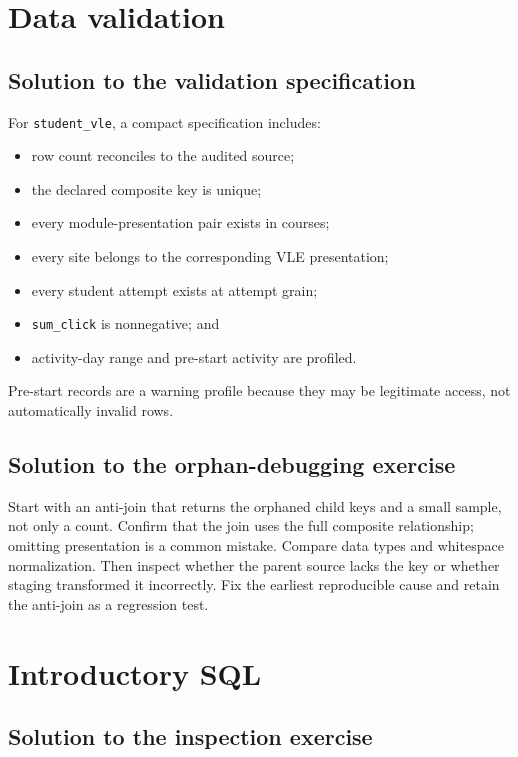 \section{Data validation}

\subsection{Solution to the validation specification}
\label{sol:validation-spec}

For \texttt{student\_vle}, a compact specification includes:
\begin{itemize}
  \item row count reconciles to the audited source;
  \item the declared composite key is unique;
  \item every module-presentation pair exists in courses;
  \item every site belongs to the corresponding VLE presentation;
  \item every student attempt exists at attempt grain;
  \item \texttt{sum\_click} is nonnegative; and
  \item activity-day range and pre-start activity are profiled.
\end{itemize}
Pre-start records are a warning profile because they may be legitimate access,
not automatically invalid rows.

\subsection{Solution to the orphan-debugging exercise}
\label{sol:orphan-debug}

Start with an anti-join that returns the orphaned child keys and a small sample,
not only a count. Confirm that the join uses the full composite relationship;
omitting presentation is a common mistake. Compare data types and whitespace
normalization. Then inspect whether the parent source lacks the key or whether
staging transformed it incorrectly. Fix the earliest reproducible cause and
retain the anti-join as a regression test.

\section{Introductory SQL}

\subsection{Solution to the inspection exercise}
\label{sol:sql-inspection}

